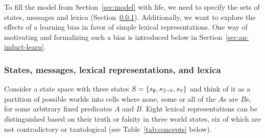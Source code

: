 \documentclass[a4paper, 11pt]{article}
\theoremstyle{Satz}
\newcommand{\set}[1]{\left\{#1\right\}}
\newcommand{\States}{\ensuremath{S}\xspace}		%
\newcommand{\state}{\ensuremath{s}\xspace}		%
\newcommand{\mystate}[1]{\ensuremath{\state_{\text{#1}}}\xspace} %
\newcommand{\ssome}{\mystate{\ensuremath{\exists\neg\forall}}}
\newcommand{\sall}{\mystate{\ensuremath{\forall}}}
\newcommand{\snone}{\mystate{\ensuremath{\emptyset}}}
\begin{document}
To fill the model from Section~\ref{sec:model} with life, we need to specify the sets of
states, messages and lexica (Section~\ref{sec:stat-mess-conc}). Additionally, we want to
explore the effects of a learning bias in favor of simple lexical representations. One way of
motivating and formalizing such a bias is introduced below in
Section~\ref{sec:an-induct-learn}.


\subsubsection{States, messages, lexical representations, and lexica} 
\label{sec:stat-mess-conc}

Consider a state space with three states $\States = \set{\snone, \ssome, \sall}$ and think of
it as a partition of possible worlds into cells where none, some or all of the $A$s are $B$s,
for some arbitrary fixed predicates $A$ and $B$. Eight lexical representations can be distinguished based on
their truth or falsity in three world states, six of which are not contradictory or
tautological (see Table~\ref{tab:concepts} below).
\end{document}
